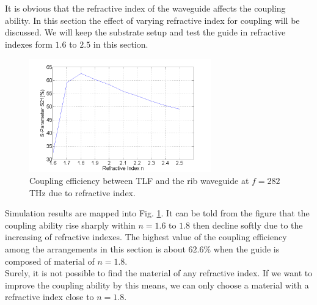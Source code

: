 It is obvious that the refractive index of the waveguide affects the coupling ability. In this section the effect of varying refractive index for coupling will be discussed. 
We will keep the substrate setup and test the guide in refractive indexes form $1.6$ to $2.5$ in this section.\\

\begin{figure}[!ht]
\centering
\includegraphics[width=0.7\textwidth]{bilder/s21_refractive_index}
\caption{Coupling efficiency between TLF and the rib waveguide at $f=282$THz due to refractive index.}
\label{fig:refractive_index}
\end{figure}
Simulation results are mapped into Fig. \ref{fig:refractive_index}. It can be told from the figure that the coupling ability rise sharply within $n=1.6$ to $1.8$ then decline softly due to the increasing of refractive indexes. The highest value of the coupling efficiency among the arrangements in this section is about $62.6\%$ when the guide is composed of material of $n=1.8$.\\

Surely, it is not possible to find the material of any refractive index. If we want to improve the coupling ability by this means, we can only choose a material with a refractive index close to $n=1.8$.
